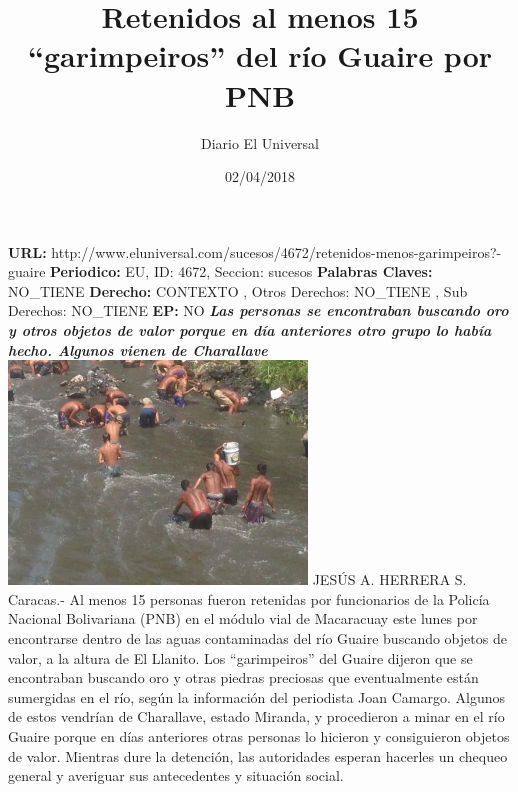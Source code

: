 \documentclass{article}%
\title{\textbf{Retenidos al menos 15 “garimpeiros” del río Guaire por PNB}}%
\author{Diario El Universal}%
\date{02/04/2018}%
\begin{document}
%
\normalsize%
\maketitle%
\textbf{URL: }%
http://www.eluniversal.com/sucesos/4672/retenidos{-}menos{-}garimpeiros?{-}guaire\newline%
%
\textbf{Periodico: }%
EU, %
ID: %
4672, %
Seccion: %
sucesos\newline%
%
\textbf{Palabras Claves: }%
NO\_TIENE\newline%
%
\textbf{Derecho: }%
CONTEXTO%
, Otros Derechos: %
NO\_TIENE%
, Sub Derechos: %
NO\_TIENE%
\newline%
%
\textbf{EP: }%
NO\newline%
\newline%
%
\textbf{\textit{Las personas se encontraban buscando oro y otros objetos de valor porque en día anteriores otro grupo lo había hecho. Algunos vienen de Charallave}}%
\newline%
\newline%
%
\includegraphics[width=300px]{20.jpg}%
\newline%
%
JESÚS A. HERRERA S.%
\newline%
%
Caracas.{-} Al menos 15 personas fueron retenidas por funcionarios de la Policía Nacional Bolivariana (PNB) en el módulo vial de Macaracuay este lunes por encontrarse dentro de las aguas contaminadas del río Guaire buscando objetos de valor, a la altura de El Llanito.%
\newline%
%
Los “garimpeiros” del Guaire dijeron que se encontraban buscando oro y otras piedras preciosas que eventualmente están sumergidas en el río, según la información del periodista Joan Camargo.%
\newline%
%
Algunos de estos vendrían de Charallave, estado Miranda, y procedieron a minar en el río Guaire porque en días anteriores otras personas lo hicieron y consiguieron objetos de valor.%
\newline%
%
Mientras dure la detención, las autoridades esperan hacerles un chequeo general y averiguar sus antecedentes y situación social.%
\newline%
%
\end{document}
